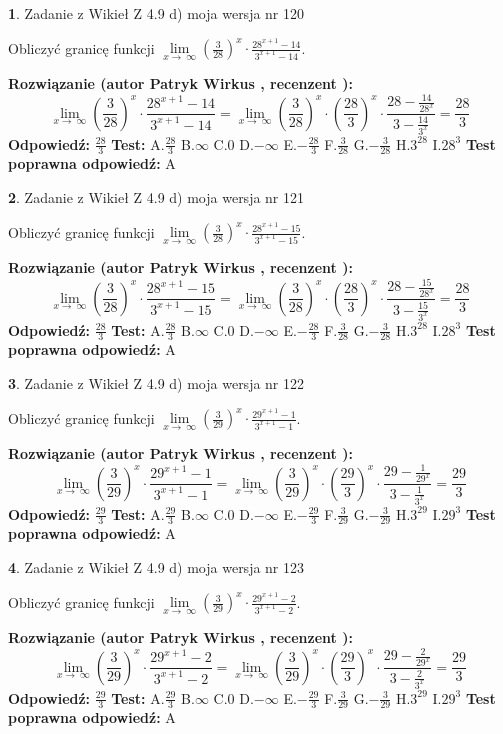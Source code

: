 \documentclass[12pt, a4paper]{article}
\theoremstyle{definition} %
\newtheorem{zad}{}
\newcommand{\zadStart}[1]{\begin{zad}#1\newline}
\newcommand{\zadStop}{\end{zad}}
\newcommand{\rozwStart}[2]{\noindent \textbf{Rozwiązanie (autor #1 , recenzent #2): }\newline}
\newcommand{\rozwStop}{\newline}
\newcommand{\odpStart}{\noindent \textbf{Odpowiedź:}\newline}
\newcommand{\odpStop}{\newline}
\newcommand{\testStart}{\noindent \textbf{Test:}\newline}
\newcommand{\testStop}{\newline}
\newcommand{\kluczStart}{\noindent \textbf{Test poprawna odpowiedź:}\newline}
\newcommand{\kluczStop}{\newline}
\begin{document}
\zadStart{Zadanie z Wikieł Z 4.9 d) moja wersja nr 120}


Obliczyć granicę funkcji  $\lim\limits_{x\to\ \infty}(\frac{3}{28})^{x}\cdot\frac{28^{x+1}-14}{3^{x+1}-14}$.
\zadStop
\rozwStart{Patryk Wirkus}{}
$$\lim\limits_{x\to\ \infty}(\frac{3}{28})^{x}\cdot\frac{28^{x+1}-14}{3^{x+1}-14}=\lim\limits_{x\to\ \infty}(\frac{3}{28})^{x}\cdot(\frac{28}{3})^{x} \cdot \frac{28-\frac{14}{28^{x}}}{3-\frac{14}{3^{x}}} = \frac{28}{3}$$
\rozwStop
\odpStart
$\frac{28}{3}$
\odpStop
\testStart
A.$\frac{28}{3}$ B.$\infty$ C.$0$ D.$-\infty$ E.$-\frac{28}{3}$
F.$\frac{3}{28}$ G.$-\frac{3}{28}$
H.$3^{28}$
I.$28^{3}$
\testStop
\kluczStart
A
\kluczStop



\zadStart{Zadanie z Wikieł Z 4.9 d) moja wersja nr 121}


Obliczyć granicę funkcji  $\lim\limits_{x\to\ \infty}(\frac{3}{28})^{x}\cdot\frac{28^{x+1}-15}{3^{x+1}-15}$.
\zadStop
\rozwStart{Patryk Wirkus}{}
$$\lim\limits_{x\to\ \infty}(\frac{3}{28})^{x}\cdot\frac{28^{x+1}-15}{3^{x+1}-15}=\lim\limits_{x\to\ \infty}(\frac{3}{28})^{x}\cdot(\frac{28}{3})^{x} \cdot \frac{28-\frac{15}{28^{x}}}{3-\frac{15}{3^{x}}} = \frac{28}{3}$$
\rozwStop
\odpStart
$\frac{28}{3}$
\odpStop
\testStart
A.$\frac{28}{3}$ B.$\infty$ C.$0$ D.$-\infty$ E.$-\frac{28}{3}$
F.$\frac{3}{28}$ G.$-\frac{3}{28}$
H.$3^{28}$
I.$28^{3}$
\testStop
\kluczStart
A
\kluczStop



\zadStart{Zadanie z Wikieł Z 4.9 d) moja wersja nr 122}


Obliczyć granicę funkcji  $\lim\limits_{x\to\ \infty}(\frac{3}{29})^{x}\cdot\frac{29^{x+1}-1}{3^{x+1}-1}$.
\zadStop
\rozwStart{Patryk Wirkus}{}
$$\lim\limits_{x\to\ \infty}(\frac{3}{29})^{x}\cdot\frac{29^{x+1}-1}{3^{x+1}-1}=\lim\limits_{x\to\ \infty}(\frac{3}{29})^{x}\cdot(\frac{29}{3})^{x} \cdot \frac{29-\frac{1}{29^{x}}}{3-\frac{1}{3^{x}}} = \frac{29}{3}$$
\rozwStop
\odpStart
$\frac{29}{3}$
\odpStop
\testStart
A.$\frac{29}{3}$ B.$\infty$ C.$0$ D.$-\infty$ E.$-\frac{29}{3}$
F.$\frac{3}{29}$ G.$-\frac{3}{29}$
H.$3^{29}$
I.$29^{3}$
\testStop
\kluczStart
A
\kluczStop



\zadStart{Zadanie z Wikieł Z 4.9 d) moja wersja nr 123}


Obliczyć granicę funkcji  $\lim\limits_{x\to\ \infty}(\frac{3}{29})^{x}\cdot\frac{29^{x+1}-2}{3^{x+1}-2}$.
\zadStop
\rozwStart{Patryk Wirkus}{}
$$\lim\limits_{x\to\ \infty}(\frac{3}{29})^{x}\cdot\frac{29^{x+1}-2}{3^{x+1}-2}=\lim\limits_{x\to\ \infty}(\frac{3}{29})^{x}\cdot(\frac{29}{3})^{x} \cdot \frac{29-\frac{2}{29^{x}}}{3-\frac{2}{3^{x}}} = \frac{29}{3}$$
\rozwStop
\odpStart
$\frac{29}{3}$
\odpStop
\testStart
A.$\frac{29}{3}$ B.$\infty$ C.$0$ D.$-\infty$ E.$-\frac{29}{3}$
F.$\frac{3}{29}$ G.$-\frac{3}{29}$
H.$3^{29}$
I.$29^{3}$
\testStop
\kluczStart
A
\kluczStop
\end{document}
